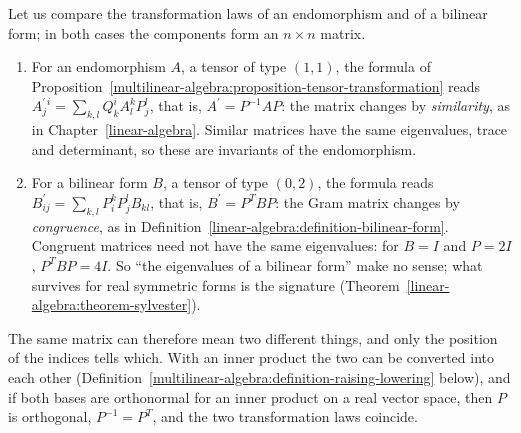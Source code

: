 \begin{example}\label{multilinear-algebra:example-tensor-transformation}
Let us compare the transformation laws of an endomorphism and of a bilinear form; in both cases the components form an $n \times n$ matrix.
\begin{enumerate}
\item For an endomorphism $A$, a tensor of type $(1,1)$, the formula of
Proposition~\ref{multilinear-algebra:proposition-tensor-transformation} reads $A^{\prime\,i}_j = \sum_{k,l}Q^i_kA^k_lP^l_j$, that is, $A^{\prime} = P^{-1}AP$: the matrix changes by
\emph{similarity}, as in Chapter~\ref{linear-algebra}. Similar matrices have the same eigenvalues, trace and determinant, so these are invariants of the endomorphism.
\item For a bilinear form $B$, a tensor of type $(0,2)$, the formula reads $B^{\prime}_{ij} = \sum_{k,l}P^k_iP^l_jB_{kl}$, that is, $B^{\prime} = P^TBP$: the Gram matrix changes by
\emph{congruence}, as in Definition~\ref{linear-algebra:definition-bilinear-form}. Congruent matrices need not have the same eigenvalues: for $B = I$ and $P = 2I$, $P^TBP = 4I$.
So ``the eigenvalues of a bilinear form'' make no sense; what survives for real symmetric forms is the signature (Theorem~\ref{linear-algebra:theorem-sylvester}).
\end{enumerate}
The same matrix can therefore mean two different things, and only the position of the indices tells which. With an inner product the two can be converted into each other
(Definition~\ref{multilinear-algebra:definition-raising-lowering} below), and if both bases are orthonormal for an inner product on a real vector space, then $P$ is orthogonal,
$P^{-1} = P^T$, and the two transformation laws coincide.
\end{example}

